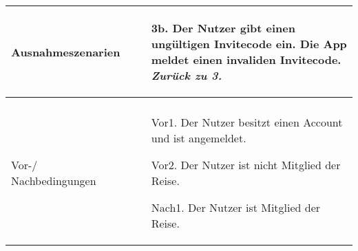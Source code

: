 \begin{table}[H]
\begin{tabularx}{0.95\textwidth}{ |l|X| }
		\hline
		Ausnahmeszenarien                      & \begin{enumerate}
			                                         \item[3b.] Der Nutzer gibt einen ungültigen Invitecode ein.
				                                         \subitem[3b1.] Die App meldet einen invaliden Invitecode. \emph{Zurück zu 3.}
		                                         \end{enumerate}     \\
		\hline
		\rowcolor{lightgray}                   &                                                                                  \\
		\hline
		Vor-/ Nachbedingungen                  & \begin{enumerate}
			                                         \item[Vor1.] Der Nutzer besitzt einen Account und ist angemeldet.
			                                         \item[Vor2.] Der Nutzer ist nicht Mitglied der Reise.
			                                         \item[Nach1.] Der Nutzer ist Mitglied der Reise.
		                                         \end{enumerate}                 \\
		\hline
	\end{tabularx}
\end{table}


